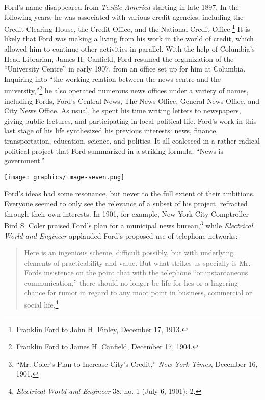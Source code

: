 \documentclass[twoside,symmetric,nobib,justified]{tufte-book}
\begin{document}
Ford's name disappeared from \emph{Textile America} starting in late
1897. In the following years, he was associated with various credit
agencies, including the Credit Clearing House, the Credit Office, and
the National Credit Office.\footnote{Franklin Ford to John H. Finley,
  December 17, 1913.} It is likely that Ford was making a living from
his work in the world of credit, which allowed him to continue other
activities in parallel. With the help of Columbia's Head Librarian,
James H. Canfield, Ford resumed the organization of the ``University
Centre'' in early 1907, from an office set up for him at Columbia.
Inquiring into ``the working relation between the news centre and the
university,''\footnote{Franklin Ford to James H. Canfield, December 17,
  1904.} he also operated numerous news offices under a variety of
names, including Fords, Ford's Central News, The News Office, General
News Office, and City News Office. As usual, he spent his time writing
letters to newspapers, giving public lectures, and participating in
local political life. Ford's work in this last stage of his life
synthesized his previous interests: news, finance, transportation,
education, science, and politics. It all coalesced in a rather radical
political project that Ford summarized in a striking formula: ``News is
government.''

\begin{figure*}
   \texttt{[image: graphics/image-seven.png]}
   \label{fig:fig7}
  \centering{}
\end{figure*}

Ford's ideas had some resonance, but never to the full extent of their
ambitions. Everyone seemed to only see the relevance of a subset of his
project, refracted through their own interests. In 1901, for example,
New York City Comptroller Bird S. Coler praised Ford's plan for a
municipal news bureau,\footnote{``Mr. Coler's Plan to Increase City's
  Credit,'' \emph{New York Times}, December 16, 1901.} while
\emph{Electrical World and Engineer} applauded Ford's proposed use of
telephone networks:

\begin{quote}
Here is an ingenious scheme, difficult possibly, but with underlying
elements of practicability and value. But what strikes us specially is
Mr. Ford\textquotesingle s insistence on the point that with the
telephone ``or instantaneous communication,'' there should no longer be
life for lies or a lingering chance for rumor in regard to any moot
point in business, commercial or social life.\footnote{\emph{Electrical
  World and Engineer} 38, no. 1 (July 6, 1901): 2.}
\end{quote}
\end{document}
